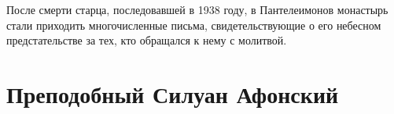 \documentclass[12pt,a4paper]{article}
\begin{document}



После смерти старца, последовавшей в 1938 году, в Пантелеимонов монастырь стали приходить многочисленные письма, свидетельствующие о его небесном предстательстве за тех, кто обращался к нему с молитвой.

\section{Преподобный Силуан Афонский}


\end{document}
